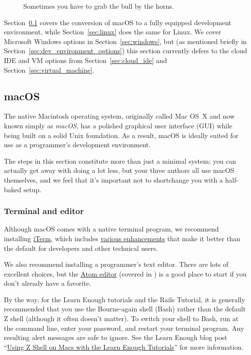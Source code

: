 \begin{figure}
\begin{center}
\end{center}
\caption{Sometimes you have to grab the bull by the horns.\label{fig:grab_bull_by_horns}}
\end{figure}

Section~\ref{sec:macos} covers the conversion of macOS to a fully equipped development environment, while Section~\ref{sec:linux} does the same for Linux. We cover Microsoft Windows options in Section~\ref{sec:windows}, but (as mentioned briefly in Section~\ref{sec:dev_environment_options}) this section currently defers to the cloud IDE and VM options from Section~\ref{sec:cloud_ide} and Section~\ref{sec:virtual_machine}.


\subsection{macOS} %
\label{sec:macos}

The native Macintosh operating system, originally called Mac OS~X and now known simply as \emph{macOS}, has a polished graphical user interface (GUI) while being built on a solid Unix foundation. As a result, macOS is ideally suited for use as a programmer's development environment.

The steps in this section constitute more than just a minimal system; you can actually get away with doing a lot less, but your three authors all use macOS themselves, and we feel that it's important not to shortchange you with a half-baked setup.

\subsubsection{Terminal and editor} %
\label{sec:terminal_and_editor}

Although macOS comes with a native terminal program, we recommend installing \href{https://www.iterm2.com/downloads.html}{iTerm}, which includes \href{https://www.iterm2.com/features.html}{various enhancements} that make it better than the default for developers and other technical users.

We also recommend installing a programmer's text editor. There are lots of excellent choices, but the \href{https://atom.io/}{Atom editor} (covered in ) is a good place to start if you don't already have a favorite.

By the way, for the Learn Enough tutorials and the Rails Tutorial, it is generally recommended that you use the Bourne-again shell (Bash) rather than the default Z shell (although it often doesn't matter). To switch your shell to Bash, run  at the command line, enter your password, and restart your terminal program. Any resulting alert messages are safe to ignore. See the Learn Enough blog post ``\href{https://news.learnenough.com/macos-bash-zshell}{Using Z Shell on Macs with the Learn Enough Tutorials}'' for more information.

